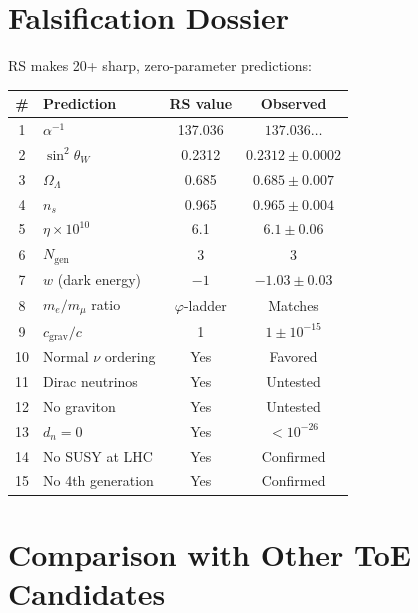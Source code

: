 \documentclass[12pt,a4paper]{article}
\theoremstyle{definition}
\theoremstyle{remark}
\begin{document}
\section{Falsification Dossier}
\label{sec:falsification}

RS makes 20+ sharp, zero-parameter predictions:

\begin{center}
\renewcommand{\arraystretch}{1.2}
\begin{tabular}{clcc}
\hline
\textbf{\#} & \textbf{Prediction} & \textbf{RS value} &
\textbf{Observed} \\
\hline
1 & $\alpha^{-1}$ & 137.036 & $137.036\ldots$ \\
2 & $\sin^2\theta_W$ & 0.2312 & $0.2312 \pm 0.0002$ \\
3 & $\Omega_\Lambda$ & 0.685 & $0.685 \pm 0.007$ \\
4 & $n_s$ & 0.965 & $0.965 \pm 0.004$ \\
5 & $\eta \times 10^{10}$ & 6.1 & $6.1 \pm 0.06$ \\
6 & $N_{\mathrm{gen}}$ & 3 & 3 \\
7 & $w$ (dark energy) & $-1$ & $-1.03 \pm 0.03$ \\
8 & $m_e/m_\mu$ ratio & $\varphi$-ladder & Matches \\
9 & $c_{\mathrm{grav}}/c$ & 1 & $1 \pm 10^{-15}$ \\
10 & Normal $\nu$ ordering & Yes & Favored \\
11 & Dirac neutrinos & Yes & Untested \\
12 & No graviton & Yes & Untested \\
13 & $d_n = 0$ & Yes & $< 10^{-26}$ \\
14 & No SUSY at LHC & Yes & Confirmed \\
15 & No 4th generation & Yes & Confirmed \\
\hline
\end{tabular}
\end{center}

\section{Comparison with Other ToE Candidates}
\label{sec:comparison}
\end{document}
